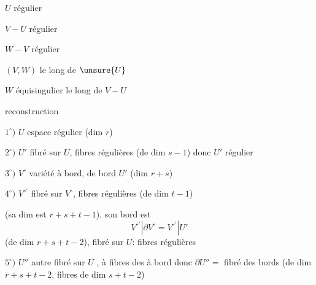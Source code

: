 
$U$  régulier

$V-U$ régulier

$W-V$  régulier

$(V,W)$  le long de $\unsure{U}$

$W$ équisingulier le long de $V-U$

reconstruction


$1^\circ)$ $U$ espace régulier (dim $r$)

$2^\circ)$ $U'$ fibré sur $U$, fibres régulières (de dim $s-1$) donc $U'$ régulier

$3^\circ)$ $V^\circ$ variété à bord, de bord $U'$ (dim $r+s$)

$4^\circ)$ $V^{\circ\prime}$ fibré sur $V^\circ$,  fibres régulières (de dim $t-1$)

(sa dim est $r+s+t-1$), son bord est
\[
V^{\circ\prime}|\partial V^\circ=V^{\circ\prime}|U'
\]
(de dim $r+s+t-2$), fibré sur $U$: fibres régulières

$5^\circ)$ $U''$ autre fibré sur $U$ , à fibres des   à bord  donc $\partial U''=$ fibré des bords (de dim $r+s+t-2$, fibres de dim $s+t-2$)


